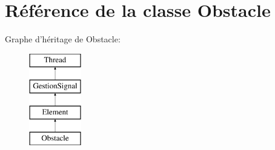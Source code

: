 \hypertarget{classObstacle}{
\section{Référence de la classe Obstacle}
\label{classObstacle}
}
Graphe d'héritage de Obstacle:\begin{figure}[H]
\begin{center}
\leavevmode
\includegraphics[height=4cm]{classObstacle}
\end{center}
\end{figure}
